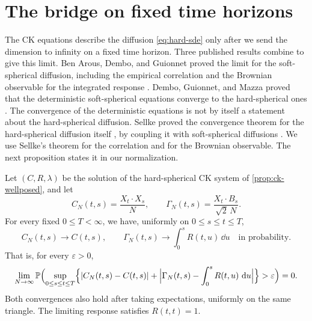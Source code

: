 \section{The bridge on fixed time horizons}\label{sec:published-inputs}

The CK equations describe the diffusion \eqref{eq:hard-sde} only after we send the dimension to infinity on a fixed time horizon. Three published results combine to give this limit.
Ben Arous, Dembo, and Guionnet proved the limit for the soft-spherical diffusion, including the empirical correlation and the Brownian observable for the integrated response \cite[arXiv version~1, Equation~(1.9), p.~4, and Theorem~1.2, p.~5]{bag2006}. Dembo, Guionnet, and Mazza proved that the deterministic soft-spherical equations converge to the hard-spherical ones \cite[Proposition~1.1 and its proof]{dgm2007}. The convergence of the deterministic equations is not by itself a statement about the hard-spherical diffusion. Sellke proved the convergence theorem for the hard-spherical diffusion itself \cite[arXiv version~5, Theorem~4.3, p.~23]{sellke2024}, by coupling it with soft-spherical diffusions \cite[arXiv version~5, Lemma~3.1, pp.~16--18]{sellke2024}. We use Sellke's theorem for the correlation and for the Brownian observable. The next proposition states it in our normalization.

\begin{proposition}\label{prop:hard-bridge}
Let $(C,R,\lambda)$ be the solution of the hard-spherical CK system of \cref{prop:ck-wellposed}, and let
\[
 C_N(t,s)=\frac{X_t\cdot X_s}N,\qquad
 \Gamma_N(t,s)=\frac{X_t\cdot B_s}{\sqrt2\,N}.
\]
For every fixed $0\le T<\infty$, we have, uniformly on $0\le s\le t\le T$,
\begin{equation}
 C_N(t,s)\longrightarrow C(t,s),\qquad
 \Gamma_N(t,s)\longrightarrow\int_0^sR(t,u)\,\dd u
 \quad\text{in probability}.
\label{eq:hard-bridge}
\end{equation}
That is, for every $\varepsilon>0$,
\begin{equation}\label{eq:hard-bridge-precise}
 \lim_{N\to\infty}\mathbb P\Bigl(\sup_{0\le s\le t\le T}\Bigl\{|C_N(t,s)-C(t,s)|+\Bigl|\Gamma_N(t,s)-\int_0^sR(t,u)\,\mathop{}\!\mathrm d u\Bigr|\Bigr\}>\varepsilon\Bigr)=0.
\end{equation}
Both convergences also hold after taking expectations, uniformly on the same triangle. The limiting response satisfies $R(t,t)=1$.
\end{proposition}

